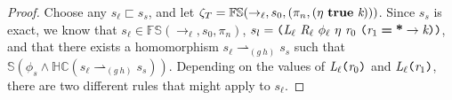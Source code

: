\begin{proof}
Choose any $s_\ell \sqsubset s_s$, and let $\zeta_T = \mathbb{FS}(\rightarrow_{\ell},s_0,(\pi_n,(\eta\ \cfgt{true}\ \cfgnt{k})))$. Since $s_s$ is exact, we know that $s_\ell \in \mathbb{FS}(\rightarrow_{\ell},s_0,\pi_n)$, $s_l = \lp \cfgnt{L}_\ell\ \cfgnt{R}_\ell\ \phi_\ell\ \eta\ \cfgnt{r}_0\ \lp \cfgnt{r}_1\; \cfgt{=}\; \cfgt{*} \rightarrow \cfgnt{k}\rp \rp$, and that there exists a homomorphism $s_\ell \rightharpoonup_{(g\ h) } s_s$ such that $\mathbb{S}( \phi_s \wedge \mathbb{HC}(s_\ell \rightharpoonup_{(g\ h)} s_s) ) $. 
Depending on the values of $\emph{L}_\ell \texttt{(} \emph{r}_0\texttt{)}$ and $\emph{L}_\ell \texttt{(} \emph{r}_1 \texttt{)}$, there are two different rules that might apply to $s_\ell$.


\end{proof}
